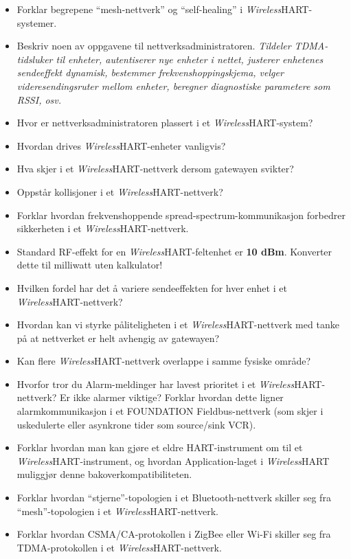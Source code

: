\begin{itemize}
\item{} Forklar begrepene ``mesh-nettverk'' og ``self-healing'' i {\sl Wireless}HART-systemer.
\item{} Beskriv noen av oppgavene til nettverksadministratoren. \textit{Tildeler TDMA-tidsluker til enheter, autentiserer nye enheter i nettet, justerer enhetenes sendeeffekt dynamisk, bestemmer frekvenshoppingskjema, velger videresendingsruter mellom enheter, beregner diagnostiske parametere som RSSI, osv.}
\item{} Hvor er nettverksadministratoren plassert i et {\sl Wireless}HART-system?
\item{} Hvordan drives {\sl Wireless}HART-enheter vanligvis?
\item{} Hva skjer i et {\sl Wireless}HART-nettverk dersom gatewayen svikter?
\item{} Oppstår kollisjoner i et {\sl Wireless}HART-nettverk?
\item{} Forklar hvordan frekvenshoppende spread-spectrum-kommunikasjon forbedrer sikkerheten i et {\sl Wireless}HART-nettverk.
\item{} Standard RF-effekt for en {\sl Wireless}HART-feltenhet er {\bf 10 dBm}. Konverter dette til milliwatt uten kalkulator!
\item{} Hvilken fordel har det å variere sendeeffekten for hver enhet i et {\sl Wireless}HART-nettverk?
\item{} Hvordan kan vi styrke påliteligheten i et {\sl Wireless}HART-nettverk med tanke på at nettverket er helt avhengig av gatewayen?
\item{} Kan flere {\sl Wireless}HART-nettverk overlappe i samme fysiske område?
\item{} Hvorfor tror du Alarm-meldinger har lavest prioritet i et {\sl Wireless}HART-nettverk? Er ikke alarmer viktige? Forklar hvordan dette ligner alarmkommunikasjon i et FOUNDATION Fieldbus-nettverk (som skjer i uskedulerte eller asynkrone tider som source/sink VCR).
\item{} Forklar hvordan man kan gjøre et eldre HART-instrument om til et {\sl Wireless}HART-instrument, og hvordan Application-laget i {\sl Wireless}HART muliggjør denne bakoverkompatibiliteten.
\item{} Forklar hvordan ``stjerne''-topologien i et Bluetooth-nettverk skiller seg fra ``mesh''-topologien i et {\sl Wireless}HART-nettverk.
\item{} Forklar hvordan CSMA/CA-protokollen i ZigBee eller Wi-Fi skiller seg fra TDMA-protokollen i et {\sl Wireless}HART-nettverk.

\end{itemize}
